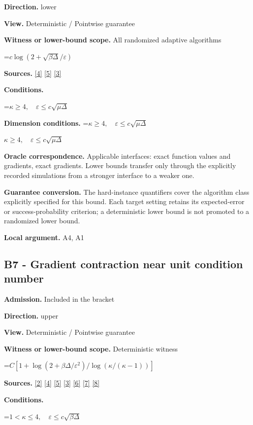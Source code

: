 \documentclass[10pt,a4paper]{article}
\newcommand{\AtlasMath}[1]{\par\begingroup\centering\setbox0=\hbox{$\displaystyle #1$}\ifdim\wd0>1.4\linewidth\typeout{ATLAS WIDE FORMULA: \the\wd0}\fi\ifdim\wd0>\linewidth\resizebox{\linewidth}{!}{\box0}\else\box0\fi\par\endgroup}
\newcommand{\AtlasInlineMath}[1]{\begingroup\setbox0=\hbox{$#1$}\ifdim\wd0>.4\linewidth\endgroup\AtlasMath{#1}\else\endgroup$#1$\fi}
\begin{document}
\textbf{Direction.} lower

\textbf{View.} Deterministic / Pointwise guarantee

\textbf{Witness or lower-bound scope.} All randomized adaptive algorithms

\AtlasMath{c\log(2+\sqrt{\beta\Delta}/\varepsilon)}
\textbf{Sources.} \href{https://arxiv.org/pdf/2101.09740v2}{[4]} \href{https://arxiv.org/pdf/2609.33360v2}{[5]} \href{https://arxiv.org/pdf/2609.10874}{[3]}

\textbf{Conditions.} 
\AtlasMath{\kappa\ge4,\quad\varepsilon\le c\sqrt{\mu\Delta}}


\textbf{Dimension conditions.} \AtlasInlineMath{\kappa\ge4,\quad\varepsilon\le c\sqrt{\mu\Delta}}

\textbf{Oracle correspondence.} Applicable interfaces: exact function values and gradients, exact gradients. Lower bounds transfer only through the explicitly recorded simulations from a stronger interface to a weaker one.

\textbf{Guarantee conversion.} The hard-instance quantifiers cover the algorithm class explicitly specified for this bound. Each target setting retains its expected-error or success-probability criterion; a deterministic lower bound is not promoted to a randomized lower bound.

\textbf{Local argument.} A4, A1

\subsection{B7 - Gradient contraction near unit condition number}
\textbf{Admission.} Included in the bracket

\textbf{Direction.} upper

\textbf{View.} Deterministic / Pointwise guarantee

\textbf{Witness or lower-bound scope.} Deterministic witness

\AtlasMath{C[1+\log(2+\beta\Delta/\varepsilon^2)/\log(\kappa/(\kappa-1))]}
\textbf{Sources.} \href{https://doi.org/10.1007/s10107-026-02352-2}{[2]} \href{https://arxiv.org/pdf/2101.09740v2}{[4]} \href{https://arxiv.org/pdf/2609.33360v2}{[5]} \href{https://arxiv.org/pdf/2609.10874}{[3]} \href{https://arxiv.org/pdf/1405.4980}{[6]} \href{https://www2.isye.gatech.edu/~nemirovs/MOR_AccuracyCertificates.pdf}{[7]} \href{https://arxiv.org/pdf/2609.20701}{[8]}

\textbf{Conditions.} 
\AtlasMath{1<\kappa\le4,\quad\varepsilon\le c\sqrt{\beta\Delta}}
\end{document}
